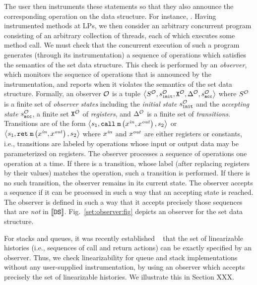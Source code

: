 The user then instruments
these statements so that they also announce the corresponding operation on
the data structure. For instance, .
Having instrumented methods at LPs, we
then consider an arbitrary concurrent program consisting of
an arbitrary collection of threads, each of which executes some method call.
We must check that the concurrent execution of such a program generates
(through its instrumentation) a sequence of operations which satisfies the
semantics of the set data structure. 
This check is performed by an {\em observer}, which 
monitors the sequence of operations that is announced by the
instrumentation, and reports when it violates the semantics of the set
data structure.
Formally, an observer ${\mathcal O}$ is a tuple
$\left\langle S^{\mathcal O},s^{\mathcal O}_{\tt init},{\tt X}^{{\mathcal O}},\Delta^{\mathcal O},s^{\mathcal O}_{\tt acc}\right\rangle$ where $S^{\mathcal O}$ is a finite set 
of {\it observer states} including the 
{\it initial state} $s^{\mathcal O}_{\tt init}$ and
the {\it accepting state} $s^{\mathcal O}_{\tt acc}$, 
a finite set ${\tt X}^{{\mathcal O}}$  
of {\it registers}, and $\Delta^{\mathcal O}$ is a finite
set of {\it transitions}.
%
%
Transitions are of the form 
$\left\langle s_1,\mathtt{call}\; {\tt m}\left(x^{\it in},x^{\it out}\right),s_2\right\rangle$ or
$\left\langle s_1,\mathtt{ret}\; {\tt m}\left(x^{\it in},x^{\it out}\right),s_2\right\rangle$
where $x^{\it in}$ and $x^{\it out}$ are either registers or constants, i.e.,
transitions are labeled by 
operations whose input or output data may be parameterized on registers.
The observer processes a sequence of operations one operation at a time.
%
If there is a transition, whose label (after replacing registers by their
values) matches the operation, such a transition is performed. 
%
If there is no
such transition, the observer remains in its current state.
The observer accepts a sequence if it can  be processed in such a way that
an accepting state is reached.
%
The observer is defined in such a way that it accepts precisely those
sequences that are {\em not} in $\left\llbracket{{\tt DS}}\right\rrbracket$.
Fig.~\ref{set:observer:fig}
depicts an observer for the set data structure.

For stacks and queues, it was recently established
~\cite{BEEH:icalp15,HSV:concur13} that the set of linearizable histories
(i.e., sequences of call and return actions)
can be exactly specified by an observer.
Thus, we check linearizability for queue and stack implementations without
any user-supplied instrumentation, by using an observer which accepts
precisely the set of linearizable histories.
We illustrate this in Section XXX.


